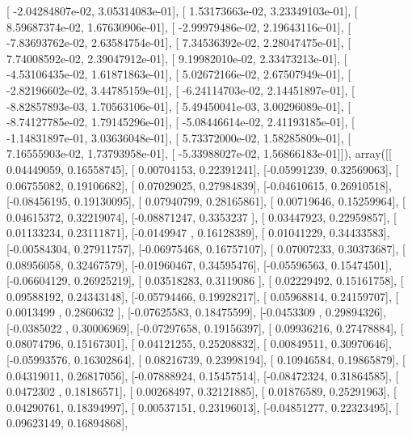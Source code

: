 \documentclass{article}
\begin{document}
       [ -2.04284807e-02,   3.05314083e-01],
       [  1.53173663e-02,   3.23349103e-01],
       [  8.59687374e-02,   1.67630906e-01],
       [ -2.99979486e-02,   2.19643116e-01],
       [ -7.83693762e-02,   2.63584754e-01],
       [  7.34536392e-02,   2.28047475e-01],
       [  7.74008592e-02,   2.39047912e-01],
       [  9.19982010e-02,   2.33473213e-01],
       [ -4.53106435e-02,   1.61871863e-01],
       [  5.02672166e-02,   2.67507949e-01],
       [ -2.82196602e-02,   3.44785159e-01],
       [ -6.24114703e-02,   2.14451897e-01],
       [ -8.82857893e-03,   1.70563106e-01],
       [  5.49450041e-03,   3.00296089e-01],
       [ -8.74127785e-02,   1.79145296e-01],
       [ -5.08446614e-02,   2.41193185e-01],
       [ -1.14831897e-01,   3.03636048e-01],
       [  5.73372000e-02,   1.58285809e-01],
       [  7.16555903e-02,   1.73793958e-01],
       [ -5.33988027e-02,   1.56866183e-01]]), array([[ 0.04449059,  0.16558745],
       [ 0.00704153,  0.22391241],
       [-0.05991239,  0.32569063],
       [ 0.06755082,  0.19106682],
       [ 0.07029025,  0.27984839],
       [-0.04610615,  0.26910518],
       [-0.08456195,  0.19130095],
       [ 0.07940799,  0.28165861],
       [ 0.00719646,  0.15259964],
       [ 0.04615372,  0.32219074],
       [-0.08871247,  0.3353237 ],
       [ 0.03447923,  0.22959857],
       [ 0.01133234,  0.23111871],
       [-0.0149947 ,  0.16128389],
       [ 0.01041229,  0.34433583],
       [-0.00584304,  0.27911757],
       [-0.06975468,  0.16757107],
       [ 0.07007233,  0.30373687],
       [ 0.08956058,  0.32467579],
       [-0.01960467,  0.34595476],
       [-0.05596563,  0.15474501],
       [-0.06604129,  0.26925219],
       [ 0.03518283,  0.3119086 ],
       [ 0.02229492,  0.15161758],
       [ 0.09588192,  0.24343148],
       [-0.05794466,  0.19928217],
       [ 0.05968814,  0.24159707],
       [ 0.0013499 ,  0.2860632 ],
       [-0.07625583,  0.18475599],
       [-0.0453309 ,  0.29894326],
       [-0.0385022 ,  0.30006969],
       [-0.07297658,  0.19156397],
       [ 0.09936216,  0.27478884],
       [ 0.08074796,  0.15167301],
       [ 0.04121255,  0.25208832],
       [ 0.00849511,  0.30970646],
       [-0.05993576,  0.16302864],
       [ 0.08216739,  0.23998194],
       [ 0.10946584,  0.19865879],
       [ 0.04319011,  0.26817056],
       [-0.07888924,  0.15457514],
       [-0.08472324,  0.31864585],
       [ 0.0472302 ,  0.18186571],
       [ 0.00268497,  0.32121885],
       [ 0.01876589,  0.25291963],
       [ 0.04290761,  0.18394997],
       [ 0.00537151,  0.23196013],
       [-0.04851277,  0.22323495],
       [ 0.09623149,  0.16894868],
\end{document}
